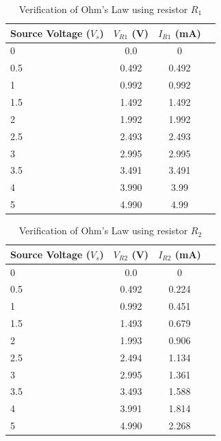 \documentclass{article}
\begin{document}
      \begin{table}[!ht]
  \captionsetup{font=large}
  \centering
  \caption{ Verification of Ohm's Law using resistor $R_1$ }
  \label{tab:ohm1}
  \begin{tabular}{   | l | c | c | r | }
  \hline

      Source Voltage ($V_s$) &     $V_{R1}$ (V) &    $I_{R1}$ (mA)     \\ \hline
      0 &    0.0 &    0     \\ \hline
      0.5 &     0.492 &    0.492     \\ \hline
      1 &    0.992 &    0.992     \\ \hline
      1.5 &    1.492 &    1.492     \\ \hline
      2 &    1.992 &    1.992     \\ \hline
      2.5 &    2.493 &    2.493     \\ \hline
      3 &    2.995 &    2.995     \\ \hline
      3.5 &    3.491 &    3.491     \\ \hline
      4 &    3.990 &    3.99     \\ \hline
      5 &    4.990 &    4.99     \\ \hline
  
  \end{tabular}
  \end{table}



      
      \begin{table}[!ht]
  \captionsetup{font=large}
  \centering
  \caption{ Verification of Ohm's Law using resistor $R_2$ }
  \label{tab:ohm2}
  \begin{tabular}{   | l | c | c | r | }
  \hline

      Source Voltage ($V_s$) &     $V_{R2}$ (V) &    $I_{R2}$ (mA)     \\ \hline
      0 &    0.0 &    0     \\ \hline
      0.5 &     0.492 &    0.224     \\ \hline
      1 &    0.992 &    0.451     \\ \hline
      1.5 &    1.493 &    0.679     \\ \hline
      2 &    1.993 &    0.906     \\ \hline
      2.5 &    2.494 &    1.134     \\ \hline
      3 &    2.995 &    1.361     \\ \hline
      3.5 &    3.493 &    1.588     \\ \hline
      4 &    3.991 &    1.814     \\ \hline
      5 &    4.990 &    2.268     \\ \hline
  
  \end{tabular}
  \end{table}
\end{document}
